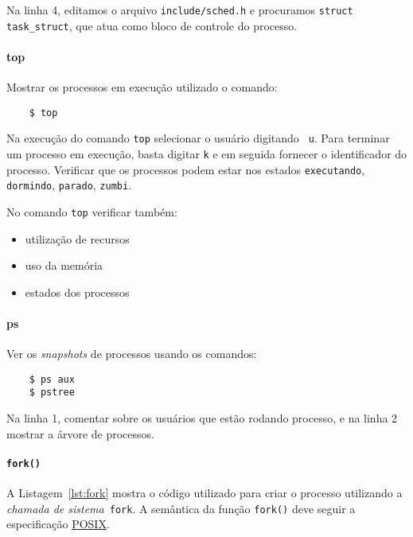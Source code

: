 Na linha 4, editamos o arquivo {\tt include/sched.h} e procuramos {\tt struct
  task\_struct}, que atua como bloco de controle do processo.

\paragraph{top} Mostrar os processos em execução utilizado o comando:

\begin{verbatim}
    $ top
\end{verbatim}


Na execução do comando {\tt top} selecionar o usuário digitando {\tt
  u}. Para terminar um processo em execução, basta digitar {\tt k} e
em seguida fornecer o identificador do processo. Verificar que os processos
podem estar nos estados {\tt executando}, {\tt dormindo}, {\tt parado},
 {\tt zumbi}.

No comando {\tt top} verificar também:

\begin{itemize}
\item utilização de recursos
\item uso da memória
\item estados dos processos
\end{itemize}

\paragraph{ps} Ver os {\em snapshots} de processos usando os comandos:

\begin{verbatim}
    $ ps aux
    $ pstree
\end{verbatim}


Na linha 1, comentar sobre os usuários que estão rodando processo, e
na linha 2 mostrar a árvore de processos.

\paragraph{{\tt fork()}} A Listagem~\ref{lst:fork} mostra o código utilizado
para criar o processo utilizando a {\em chamada de sistema\/}\ {\tt fork}. A
semântica da função {\tt fork()} deve seguir a especificação
\href{http://pubs.opengroup.org/onlinepubs/009695399/functions/fork.html}{POSIX}.

 

